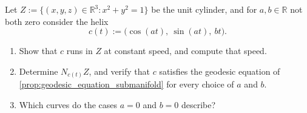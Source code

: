 \begin{aiexercise}
\label{ex:ai_cylinder_geodesics}
Let $Z := \{(x,y,z) \in \mathbb{R}^3 : x^2+y^2 = 1\}$ be the unit cylinder, and for
$a, b \in \mathbb{R}$ not both zero consider the helix
\[c(t) := \big(\cos(at),\ \sin(at),\ bt\big).\]
\begin{enumerate}[label=\textbf{(\alph*)}]
  \item Show that $c$ runs in $Z$ at constant speed, and compute that speed.
  \item Determine $N_{c(t)}Z$, and verify that $c$ satisfies the geodesic equation of
    \cref{prop:geodesic_equation_submanifold} for every choice of $a$ and $b$.
  \item Which curves do the cases $a = 0$ and $b = 0$ describe?
\end{enumerate}
\end{aiexercise}

